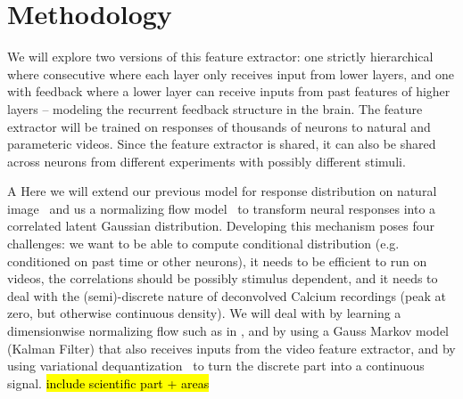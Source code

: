 \documentclass[B2,COG]{ercgrant}
\begin{document}
\section{Methodology}
\color{red}
\blindtext[2]


We will explore two versions of this feature extractor: one strictly hierarchical where consecutive where each layer only receives input from lower layers, and one with feedback where a lower layer can receive inputs from past features of higher layers -- modeling the recurrent feedback structure in the brain. The feature extractor will be trained on responses of thousands of neurons to natural and parameteric videos. Since the feature extractor is shared, it can also be shared across neurons from different experiments with possibly different stimuli. 


A  Here we will extend our previous model for response distribution on natural image~ and us a normalizing flow model~\parencite{Rezende2015-mx} to transform neural responses into a correlated latent Gaussian distribution. Developing this mechanism poses four challenges:  we want to be able to compute conditional distribution (e.g. conditioned on past time or other neurons),  it needs to be efficient to run on videos,  the correlations should be possibly stimulus dependent, and  it needs to deal with the (semi)-discrete nature of deconvolved Calcium recordings (peak at zero, but otherwise continuous density). We will deal with  by learning a dimensionwise normalizing flow such as in \cite{Bashiri2021-or},  and  by using a Gauss Markov model (Kalman Filter) that also receives inputs from the video feature extractor, and  by using variational dequantization~\parencite{Hoogeboom2021-zs} to turn the discrete part into a continuous signal.  \hl{include scientific part + areas}




\nocite{*} %

\renewcommand\bibsection{\section*{\refname}}


\end{document}
